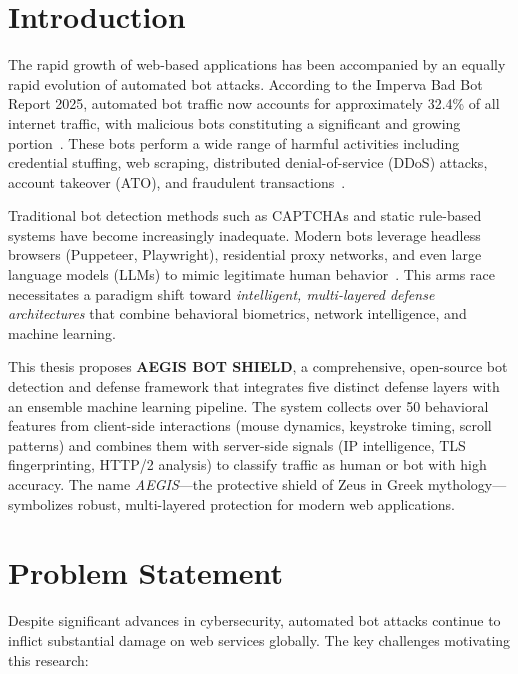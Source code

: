 \documentclass[12pt, a4paper]{article}
\begin{document}
\section{Introduction}

The rapid growth of web-based applications has been accompanied by an equally rapid evolution of automated bot attacks. According to the Imperva Bad Bot Report 2025, automated bot traffic now accounts for approximately 32.4\% of all internet traffic, with malicious bots constituting a significant and growing portion~\cite{imperva2025}. These bots perform a wide range of harmful activities including credential stuffing, web scraping, distributed denial-of-service (DDoS) attacks, account takeover (ATO), and fraudulent transactions~\cite{owasp_oat}.

Traditional bot detection methods such as CAPTCHAs and static rule-based systems have become increasingly inadequate. Modern bots leverage headless browsers (Puppeteer, Playwright), residential proxy networks, and even large language models (LLMs) to mimic legitimate human behavior~\cite{jonker2019}. This arms race necessitates a paradigm shift toward \textit{intelligent, multi-layered defense architectures} that combine behavioral biometrics, network intelligence, and machine learning.

This thesis proposes \textbf{AEGIS BOT SHIELD}, a comprehensive, open-source bot detection and defense framework that integrates five distinct defense layers with an ensemble machine learning pipeline. The system collects over 50 behavioral features from client-side interactions (mouse dynamics, keystroke timing, scroll patterns) and combines them with server-side signals (IP intelligence, TLS fingerprinting, HTTP/2 analysis) to classify traffic as human or bot with high accuracy. The name \textit{AEGIS}---the protective shield of Zeus in Greek mythology---symbolizes robust, multi-layered protection for modern web applications.

\section{Problem Statement}

Despite significant advances in cybersecurity, automated bot attacks continue to inflict substantial damage on web services globally. The key challenges motivating this research:
\end{document}

